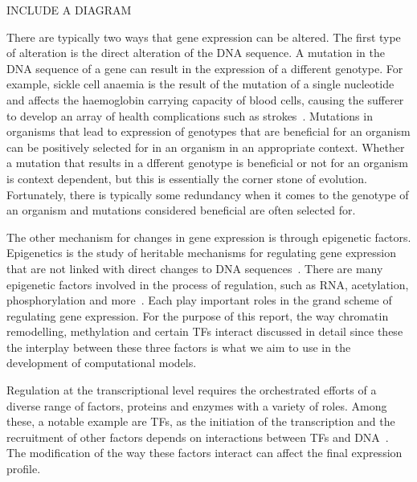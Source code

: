         \begin{centering}
            INCLUDE A DIAGRAM
        \end{centering}
        There are typically two ways that gene expression can be altered.
        The first type of alteration is the direct alteration of the DNA sequence. A mutation in the DNA sequence of a gene can result in the expression of a different genotype.        %
        For example, sickle cell anaemia is the result of the mutation of a single nucleotide and affects the haemoglobin carrying capacity of blood cells, causing the sufferer to develop an array of health complications such as strokes~\cite{clancy2008dna}. 
        Mutations in organisms that lead to expression of genotypes that are beneficial for an organism can be positively selected for in an organism in an appropriate context. Whether a mutation that results in a dfferent genotype is beneficial or not for an organism is context dependent, but this is essentially the corner stone of evolution. Fortunately, there is typically some redundancy when it comes to the genotype of an organism and mutations considered beneficial are often selected for.
        
        The other mechanism for changes in gene expression is through epigenetic factors. Epigenetics is the study of heritable mechanisms for regulating gene expression that are not linked with direct changes to DNA sequences~\cite{holliday2006epigenetics}. There are many epigenetic factors involved in the process of regulation, such as RNA, acetylation, phosphorylation and more~\cite{geiman2002chromatin, jaenisch2003epigenetic,holoch2015rna, waterland2003transposable}. Each play important roles in the grand scheme of regulating gene expression. For the purpose of this report, the way chromatin remodelling, methylation and certain TFs interact discussed in detail since these the interplay between these three factors is what we aim to use in the development of computational models.


        Regulation at the transcriptional level requires the orchestrated efforts of a diverse range of factors, proteins and enzymes with a variety of roles. Among these, a notable example are TFs, as the initiation of the transcription and the recruitment of other factors depends on interactions between TFs and DNA~\cite{lemon2000orchestrated}. The modification of the way these factors interact can affect the final expression profile. 
        
